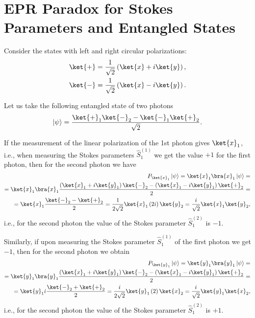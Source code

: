 \section{EPR Paradox for Stokes Parameters and Entangled States}

Consider the states with left and right circular polarizations:
\begin{eqnarray}
  \ket{ + } = \frac{1}{\sqrt{2}}
  \left(
  \ket{x} + i \ket{y}
  \right),
  \nonumber \\
  \ket{ - } = \frac{1}{\sqrt{2}}
  \left(
  \ket{x} - i \ket{y}
  \right).
  \nonumber
\end{eqnarray}

Let us take the following entangled state of two photons
\begin{eqnarray}
  \left|\psi\right> = \frac{
    \ket{ + }_1\ket{ - }_2 -
    \ket{ - }_1\ket{ + }_2
  }{\sqrt{2}}.
  \nonumber
\end{eqnarray}

If the measurement of the linear polarization of the 1st photon gives
$\ket{x}_1$, i.e., when measuring the Stokes parameters
$\hat{S}_1^{(1)}$ we get the value $+1$ for the first photon, then for
the second photon we have
\begin{eqnarray}
  P_{\ket{x}_1}\left|\psi\right> =
  \ket{x}_1\bra{x}_1 \left|\psi\right> =
  \nonumber \\
  =
  \ket{x}_1\bra{x}_1
  \frac{
    \left( \ket{x}_1 + i \ket{y}_1 \right)\ket{ - }_2 -
    \left( \ket{x}_1 - i \ket{y}_1 \right)\ket{ + }_2
  }{2} =
  \nonumber \\
  =
  \ket{x}_1
  \frac{\ket{ - }_2 - \ket{ + }_2}{2} =
  \frac{1}{2\sqrt{2}}\ket{x}_1 \left(2 i\right)
  \ket{y}_2 =
  \frac{i}{\sqrt{2}}\ket{x}_1\ket{y}_2,
  \nonumber
\end{eqnarray}
i.e., for the second photon the value of the Stokes parameter 
$\hat{S}_1^{(2)}$ is $-1$.

Similarly, if upon measuring the Stokes parameter $\hat{S}_1^{(1)}$
of the first photon we get $-1$, then for the second photon we obtain
\begin{eqnarray}
  P_{\ket{y}_1}\left|\psi\right> =
  \ket{y}_1\bra{y}_1 \left|\psi\right> =
  \nonumber \\
  =
  \ket{y}_1\bra{y}_1
  \frac{
    \left( \ket{x}_1 + i \ket{y}_1 \right)\ket{ - }_2 -
    \left( \ket{x}_1 - i \ket{y}_1 \right)\ket{ + }_2
  }{2} =
  \nonumber \\
  =
  \ket{y}_1 i 
  \frac{\ket{ - }_2 + \ket{ + }_2}{2} =
  \frac{i}{2\sqrt{2}}\ket{y}_1 \left(2\right)
  \ket{x}_2 =
  \frac{i}{\sqrt{2}}\ket{y}_1\ket{x}_2,
  \nonumber
\end{eqnarray}
i.e., for the second photon the value of the Stokes parameter 
$\hat{S}_1^{(2)}$ is $+1$.


